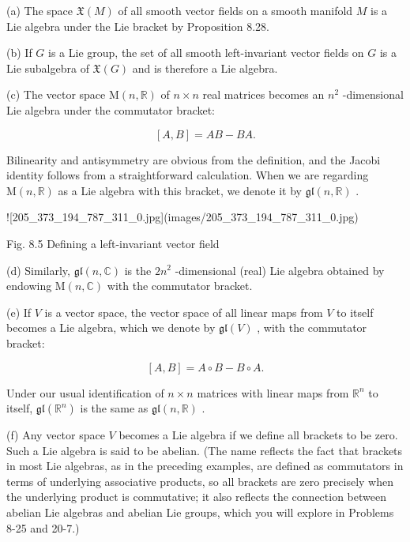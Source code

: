 \begin{example}
\label{ex:8-36}
\leanok
{}
(a) The space $\mathfrak{X}\left( M\right)$ of all smooth vector fields on a smooth manifold $M$ is a Lie algebra under the Lie bracket by Proposition 8.28.

(b) If $G$ is a Lie group, the set of all smooth left-invariant vector fields on $G$ is a Lie subalgebra of $\mathfrak{X}\left( G\right)$ and is therefore a Lie algebra.

(c) The vector space $\mathrm{M}\left( {n,\mathbb{R}}\right)$ of $n \times  n$ real matrices becomes an ${n}^{2}$ -dimensional Lie algebra under the commutator bracket:

\[
\left\lbrack  {A, B}\right\rbrack   = {AB} - {BA}.
\]

Bilinearity and antisymmetry are obvious from the definition, and the Jacobi identity follows from a straightforward calculation. When we are regarding $\mathrm{M}\left( {n,\mathbb{R}}\right)$ as a Lie algebra with this bracket, we denote it by $\mathfrak{{gl}}\left( {n,\mathbb{R}}\right)$ .

![205_373_194_787_311_0.jpg](images/205_373_194_787_311_0.jpg)

Fig. 8.5 Defining a left-invariant vector field

(d) Similarly, $\mathfrak{{gl}}\left( {n,\mathbb{C}}\right)$ is the $2{n}^{2}$ -dimensional (real) Lie algebra obtained by endowing $\mathrm{M}\left( {n,\mathbb{C}}\right)$ with the commutator bracket.

(e) If $V$ is a vector space, the vector space of all linear maps from $V$ to itself becomes a Lie algebra, which we denote by $\mathfrak{{gl}}\left( V\right)$ , with the commutator bracket:

\[
\left\lbrack  {A, B}\right\rbrack   = A \circ  B - B \circ  A.
\]

Under our usual identification of $n \times  n$ matrices with linear maps from ${\mathbb{R}}^{n}$ to itself, $\mathfrak{{gl}}\left( {\mathbb{R}}^{n}\right)$ is the same as $\mathfrak{{gl}}\left( {n,\mathbb{R}}\right)$ .

(f) Any vector space $V$ becomes a Lie algebra if we define all brackets to be zero. Such a Lie algebra is said to be abelian. (The name reflects the fact that brackets in most Lie algebras, as in the preceding examples, are defined as commutators in terms of underlying associative products, so all brackets are zero precisely when the underlying product is commutative; it also reflects the connection between abelian Lie algebras and abelian Lie groups, which you will explore in Problems 8-25 and 20-7.)
\end{example}

